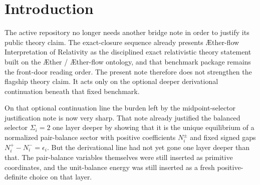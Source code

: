 \documentclass[11pt]{article}
\newcommand{\Aether}{\AE{}ther}
\newcommand{\Aflow}{\AE{}ther-flow}
\newcommand{\TheoryName}{\Aflow{} Interpretation of Relativity}
\newcommand{\AbsScaleAmp}{\omega_{\mathrm{br}}}
\newcommand{\SelEnergy}{\mathscr E_{\mathrm{mid}}}
\newcommand{\BalEnergy}{\mathscr E_{\mathrm{bal}}}
\newcommand{\AnchEnergy}{\mathscr E_{\mathrm{anch}}}
\newcommand{\BalIndex}{\mathcal I_{\mathrm{bal}}}
\begin{document}
\begin{abstract}
The current unit-balance energy is also no longer primitive. It is the reduction of the deeper anchor-relative drift energy
\[
\AnchEnergy
:=
\sum_{i\in\BalIndex}
\left[
\left(\frac{M_i^+}{H_i}-1\right)^2
+
\left(\frac{M_i^-}{H_i}-1\right)^2
\right]
=
\BalEnergy
=
3+\frac12\,\SelEnergy.
\]
Thus the balanced selector \(\Sigma_i=2\) is the unique minimizer on the normalized quotient, while its representatives upstairs are the projective family
\[
M_i^+=H_i\left(1+\frac{\epsilon_i}{2}\right),
\qquad
M_i^-=H_i\left(1-\frac{\epsilon_i}{2}\right).
\]

This new layer does create a genuine quotient, but only an internal one:
\[
(H_i,M_i^+,M_i^-)\sim(\rho_i H_i,\rho_i M_i^+,\rho_i M_i^-),
\qquad
\rho_i>0.
\]
That projective quotient produces the normalized pair-balance variables. It does not identify distinct positive values of \(\AbsScaleAmp\) or of the orbit modulus, and it introduces no vacuum-angle locking. The present verdict therefore stays in force: the positive scale orbit is still a canonical-normalization orbit rather than a proved redundancy, and the global \(O(2)\) vacuum angle remains residual.

The scope is deliberately narrow. This note does not claim that the anchored positive-pair sector is already the final substrate microphysics. Its narrower positive result is that the normalized pair-balance layer and its unit-balance energy are no longer primitive input. They arise as the reduced/projective image of a still-deeper anchored sector while leaving the entire already-frozen downstream package unchanged.
\end{abstract}

\section{Introduction}

The active repository no longer needs another bridge note in order to justify its public theory claim. The exact-closure sequence already presents \TheoryName{} as the disciplined exact relativistic theory statement built on the \Aether{} / \Aflow{} ontology, and that benchmark package remains the front-door reading order. The present note therefore does not strengthen the flagship theory claim. It acts only on the optional deeper derivational continuation beneath that fixed benchmark.

On that optional continuation line the burden left by the midpoint-selector justification note is now very sharp. That note already justified the balanced selector \(\Sigma_i=2\) one layer deeper by showing that it is the unique equilibrium of a normalized pair-balance sector with positive coefficients \(N_i^\pm\) and fixed signed gaps \(N_i^+-N_i^-=\epsilon_i\). But the derivational line had not yet gone one layer deeper than that. The pair-balance variables themselves were still inserted as primitive coordinates, and the unit-balance energy was still inserted as a fresh positive-definite choice on that layer.
\end{document}
